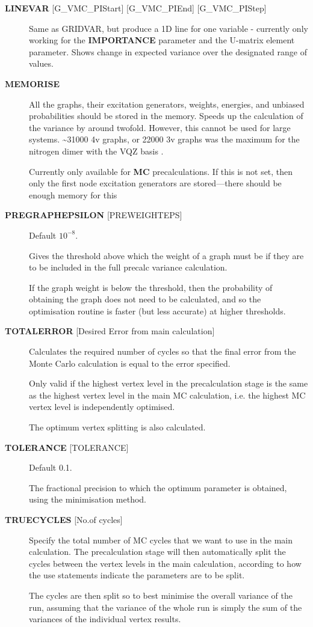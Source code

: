 \documentclass[openany,a4paper,10pt,english]{manual}
\begin{document}
\begin{description}
\item[\textbf{LINEVAR} {[}G\_VMC\_PIStart{]} {[}G\_VMC\_PIEnd{]} {[}G\_VMC\_PIStep{]}] \leavevmode
Same as GRIDVAR, but produce a 1D line for one variable - currently
only working for the \textbf{IMPORTANCE} parameter and the U-matrix element
parameter. Shows change in expected variance over the designated range
of values.

\item[\textbf{MEMORISE}] \leavevmode
All the graphs, their excitation generators, weights, energies, and
unbiased probabilities should be stored in the memory.  Speeds up
the calculation of the variance by around twofold. However, this
cannot be used for large systems.  \textasciitilde{}31000 4v graphs, or 22000 3v
graphs was the maximum for the nitrogen dimer with the VQZ basis .

Currently only available for \textbf{MC} precalculations. If this is not
set, then only the first node excitation generators are stored---there
should be enough memory for this

\item[\textbf{PREGRAPHEPSILON} {[}PREWEIGHTEPS{]}] \leavevmode
Default $10^{-8}$.

Gives the threshold above which the weight of a graph must be if
they are to be included in the full precalc variance calculation.

If the graph weight is below the threshold, then the probability
of obtaining the graph does not need to be calculated, and so
the optimisation routine is faster (but less accurate) at higher
thresholds.

\item[\textbf{TOTALERROR} {[}Desired Error from main calculation{]}] \leavevmode
Calculates the required number of cycles so that the final
error from the Monte Carlo calculation is equal to the error specified.

Only valid if the highest vertex level in the precalculation stage is the
same as the highest vertex level in the main MC calculation, i.e. the
highest MC vertex level is independently optimised.

The optimum vertex splitting is also calculated.

\item[\textbf{TOLERANCE} {[}TOLERANCE{]}] \leavevmode
Default 0.1.

The fractional precision to which the optimum parameter is obtained,
using the minimisation method.

\item[\textbf{TRUECYCLES} {[}No.of cycles{]}] \leavevmode
Specify the total number of MC cycles that we want to use in the
main calculation.  The precalculation stage will then automatically
split the cycles between the vertex levels in the main calculation,
according to how the use statements indicate the parameters are to
be split.

The cycles are then split so to best minimise the overall variance
of the run, assuming that the variance of the whole run is simply
the sum of the variances of the individual vertex results.

\end{description}
\end{document}
